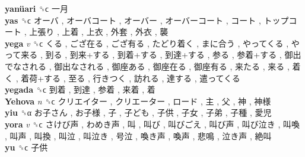 \textbf{yanüari} ␝ϲ   一月   \\
\textbf{yas} ␝ϲ   オーバ ,  オーバコート ,  オーバー ,  オーバーコート ,  コート ,  トップコート ,  上張り ,  上着 ,  上衣 ,  外套 ,  外衣 ,  襲   \\
\textbf{yega} \emph{v}  ␝ϲ   くる ,  ござ在る ,  ござ有る ,  たどり着く ,  まに合う ,  やってくる ,  やって来る ,  到る ,  到来+する ,  到着+する ,  到達+する ,  参る ,  参着+する ,  御出でなされる ,  御出なされる ,  御座ある ,  御座在る ,  御座有る ,  来たる ,  来る ,  着く ,  着荷+する ,  至る ,  行きつく ,  訪れる ,  達する ,  遣ってくる   \\
\textbf{yegada} ␝ϲ   到着 ,  到達 ,  参着 ,  来着 ,  着   \\
\textbf{Yehova} \emph{n}  ␝ϲ   クリエイター ,  クリエーター ,  ロード ,  主 ,  父 ,  神 ,  神様   \\
\textbf{yiu} ␝α   お子さん ,  お子様 ,  子 ,  子ども ,  子供 ,  子女 ,  子弟 ,  子種 ,  愛児   \\
\textbf{yora} \emph{v}  ␝ϲ   さけび声 ,  わめき声 ,  叫 ,  叫び ,  叫びごえ ,  叫び声 ,  叫び泣き ,  叫喚 ,  叫声 ,  叫換 ,  叫泣 ,  叫泣き ,  号泣 ,  喚き声 ,  喚声 ,  悲鳴 ,  泣き声 ,  絶叫   \\
\textbf{yu} ␝ϲ   子供   \\

